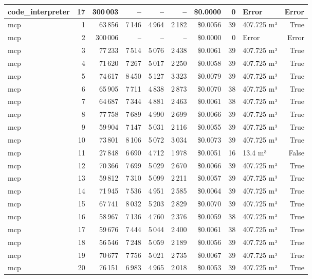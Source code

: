 \documentclass[a4paper,11pt]{article}
\begin{document}
\begin{table}[H]
{\begin{tabular}{l r r r r r r r l r}
code\_interpreter & 17 & 300\,003 & -- & -- & -- & \$0.0000 & 0 & Error & Error \\
\midrule
mcp & 1 & 63\,856 & 7\,146 & 4\,964 & 2\,182 & \$0.0056 & 39 & 407.725 m³ & True \\
mcp & 2 & 300\,006 & -- & -- & -- & \$0.0000 & 0 & Error & Error \\
mcp & 3 & 77\,233 & 7\,514 & 5\,076 & 2\,438 & \$0.0061 & 39 & 407.725 m³ & True \\
mcp & 4 & 71\,620 & 7\,267 & 5\,017 & 2\,250 & \$0.0058 & 39 & 407.725 m³ & True \\
mcp & 5 & 74\,617 & 8\,450 & 5\,127 & 3\,323 & \$0.0079 & 39 & 407.725 m³ & True \\
mcp & 6 & 65\,905 & 7\,711 & 4\,838 & 2\,873 & \$0.0070 & 38 & 407.725 m³ & True \\
mcp & 7 & 64\,687 & 7\,344 & 4\,881 & 2\,463 & \$0.0061 & 38 & 407.725 m³ & True \\
mcp & 8 & 77\,758 & 7\,689 & 4\,990 & 2\,699 & \$0.0066 & 39 & 407.725 m³ & True \\
mcp & 9 & 59\,904 & 7\,147 & 5\,031 & 2\,116 & \$0.0055 & 39 & 407.725 m³ & True \\
mcp & 10 & 73\,801 & 8\,106 & 5\,072 & 3\,034 & \$0.0073 & 39 & 407.725 m³ & True \\
mcp & 11 & 27\,848 & 6\,690 & 4\,712 & 1\,978 & \$0.0051 & 16 & 13.4 m³ & False \\
mcp & 12 & 70\,366 & 7\,699 & 5\,029 & 2\,670 & \$0.0066 & 39 & 407.725 m³ & True \\
mcp & 13 & 59\,812 & 7\,310 & 5\,099 & 2\,211 & \$0.0057 & 39 & 407.725 m³ & True \\
mcp & 14 & 71\,945 & 7\,536 & 4\,951 & 2\,585 & \$0.0064 & 39 & 407.725 m³ & True \\
mcp & 15 & 67\,741 & 8\,032 & 5\,203 & 2\,829 & \$0.0070 & 39 & 407.725 m³ & True \\
mcp & 16 & 58\,967 & 7\,136 & 4\,760 & 2\,376 & \$0.0059 & 38 & 407.725 m³ & True \\
mcp & 17 & 59\,676 & 7\,444 & 5\,044 & 2\,400 & \$0.0061 & 38 & 407.725 m³ & True \\
mcp & 18 & 56\,546 & 7\,248 & 5\,059 & 2\,189 & \$0.0056 & 39 & 407.725 m³ & True \\
mcp & 19 & 70\,677 & 7\,756 & 5\,021 & 2\,735 & \$0.0067 & 39 & 407.725 m³ & True \\
mcp & 20 & 76\,151 & 6\,983 & 4\,965 & 2\,018 & \$0.0053 & 39 & 407.725 m³ & True \\

\end{tabular}}
\end{table}
\end{document}
